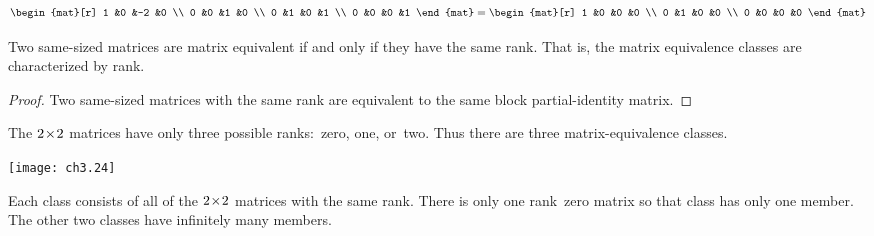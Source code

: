 \begin{example}
\begin{equation*}
    \begin{mat}[r]
       1  &0  &-2  &0   \\
       0  &0  &1  &0   \\
       0  &1  &0  &1   \\
       0  &0  &0  &1
    \end{mat}
    =
    \begin{mat}[r]
       1  &0  &0  &0   \\
       0  &1  &0  &0  \\
       0  &0  &0  &0
    \end{mat}
\end{equation*}
\end{example}

\begin{corollary}
Two same-sized matrices are matrix equivalent if and only if they
have the same rank.
That is, the matrix equivalence classes are
characterized by rank.
\end{corollary}

\begin{proof}
Two same-sized matrices with the same rank
are equivalent to the same block partial-identity matrix.
\end{proof}

\begin{example}
The $2 \! \times \! 2$ matrices have
only three possible ranks:~zero, one, or~two.
Thus there are three matrix-equivalence classes.
\begin{center} %
  \texttt{[image: ch3.24]}
\end{center}
Each class consists of all of the $2 \! \times \! 2$ matrices with the same rank. 
There is only one rank~zero matrix so that class has only
one member. 
The other two classes have infinitely many members.
\end{example}

